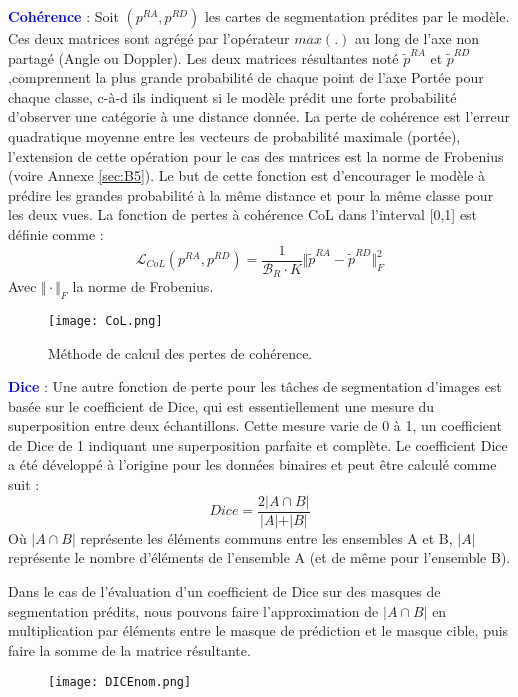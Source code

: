 \textcolor{blue}{\textbf{Cohérence}} : Soit $(p^{RA},p^{RD}) $ les cartes de segmentation prédites par le modèle. Ces deux matrices sont agrégé par l'opérateur $max(.)$ au long de l'axe non partagé (Angle ou Doppler). Les deux matrices résultantes noté $\tilde{p}^{RA}$ et $\tilde{p}^{RD}$,comprennent la plus grande probabilité de chaque point de l'axe Portée pour chaque classe, c-à-d ils indiquent si le modèle prédit une forte probabilité d'observer une catégorie à une distance donnée.
La perte de cohérence est l'erreur quadratique moyenne entre les vecteurs de probabilité maximale (portée), l'extension de cette opération pour le cas des matrices est la norme de Frobenius (voire Annexe \ref{sec:B5}). Le but de cette fonction est d'encourager le modèle à prédire les grandes probabilité à la même distance et pour la même classe pour les deux vues. 
La fonction de pertes à cohérence CoL dans l'interval [0,1] est définie comme : 
\begin{equation}
  \mathcal{L}_{CoL} (p^{RA},p^{RD})= \frac{1}{\mathcal{B}_R \cdot K} \Vert\tilde{p}^{RA}-\tilde{p}^{RD} \Vert_F ^2
\end{equation}
Avec $\Vert \cdot \Vert_F $ la norme de Frobenius.
\begin{figure}[hbt!]
  \centering
  \texttt{[image: CoL.png]}
  \caption{Méthode de calcul des pertes de cohérence.\cite{25}}
\end{figure}

\textcolor{blue}{\textbf{Dice}} : Une autre fonction de perte pour les tâches de segmentation d'images est basée sur le coefficient de Dice, qui est essentiellement une mesure du superposition entre deux échantillons. Cette mesure varie de 0 à 1, un coefficient de Dice de 1 indiquant une superposition parfaite et complète. Le coefficient Dice \cite{55} a été développé à l'origine pour les données binaires et peut être calculé comme suit :
\begin{equation}
  Dice=\frac{2\vert A \cap B \vert }{\vert A \vert + \vert B \vert}
\end{equation}
Où $\vert A \cap B \vert$ représente les éléments communs entre les ensembles A et B, $\vert A \vert$ représente le nombre d'éléments de l'ensemble A (et de même pour l'ensemble B).

Dans le cas de l'évaluation d'un coefficient de Dice sur des masques de segmentation prédits, nous pouvons faire l'approximation de $\vert A \cap B \vert$  en multiplication par éléments entre le masque de prédiction et le masque cible, puis faire la somme de la matrice résultante.
\begin{figure}[hbt!]
  \centering
  \texttt{[image: DICEnom.png]}
\end{figure}

